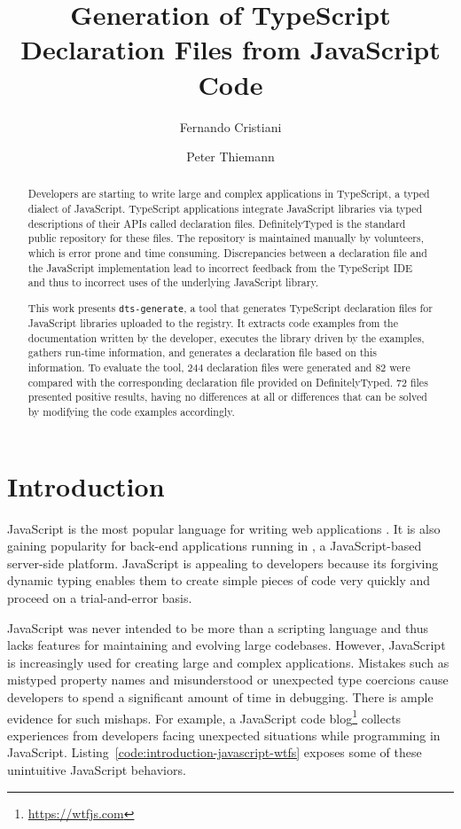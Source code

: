 \documentclass[english,cleveref,autoref,submission]{programming}
\title{Generation of TypeScript Declaration Files from JavaScript Code}
\author{Fernando Cristiani}
\affiliation{Hochschule Karlsruhe, Germany }
\author{Peter Thiemann}
\affiliation{Universität Freiburg, Germany}
\newcommand{\coderef}[1]{Listing~\ref{#1}}
\begin{document}
\maketitle

\begin{abstract}
Developers are starting to write large and complex applications in
TypeScript, a typed dialect of JavaScript. TypeScript applications
integrate JavaScript libraries via typed descriptions of their APIs
called declaration files. DefinitelyTyped is the standard public
repository for these files.
The repository is maintained manually by volunteers, which
is error prone and time consuming. Discrepancies between a
declaration file and the JavaScript implementation lead to
incorrect feedback from the TypeScript IDE and thus to incorrect uses
of the underlying JavaScript library.

This work presents \texttt{dts-generate}, a tool that generates
TypeScript declaration files for JavaScript libraries uploaded to the \NPM{}
registry. It extracts code examples from the documentation written by
the developer, executes the library driven by the examples, gathers
run-time information, and generates a declaration file based on this
information. To evaluate the tool, 244 declaration files were generated and 82 were
compared with the corresponding declaration file provided on DefinitelyTyped. 72 files presented positive results, having no differences at all or differences that can be solved by modifying the code examples accordingly.

\end{abstract}

\section{Introduction}
\label{sec:introduction}
JavaScript is the most popular language for writing web
applications \cite{github-statistics}. It is also gaining popularity
for back-end applications running in \NodeJS{}, a JavaScript-based
server-side platform. JavaScript is appealing to developers because
its forgiving dynamic typing enables 
them to create simple pieces of code very quickly and proceed on a
trial-and-error basis.

JavaScript was never intended to be more than a
scripting language and thus lacks features for maintaining and evolving large
codebases. However, JavaScript is increasingly used for creating large and complex
applications. 
Mistakes such as mistyped property
names and misunderstood or unexpected type coercions cause developers
to spend a significant amount of time in debugging. There is ample
evidence for such mishaps. For example, a 
JavaScript code blog\footnote{\url{https://wtfjs.com}} collects experiences
from developers facing unexpected situations while programming in
JavaScript. \coderef{code:introduction-javascript-wtfs} exposes some
of these unintuitive JavaScript behaviors. 
\end{document}
